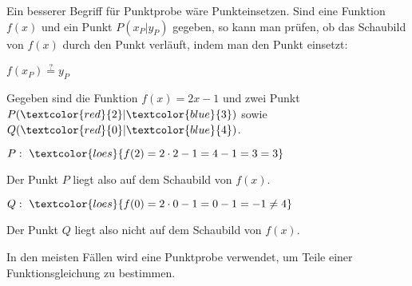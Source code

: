 Ein besserer Begriff für Punktprobe wäre Punkteinsetzen. Sind eine Funktion \(f(x)\) und ein Punkt \(P(x_P\vert y_P)\) gegeben, so kann man prüfen, ob das Schaubild von \(f(x)\) durch den Punkt verläuft, indem man den Punkt einsetzt:
\begin{tcolorbox}
	\centering
	\textcolor{loestc}{\(f(x_P)\overset{?}{=}y_P\)}
\end{tcolorbox}
\begin{bsp}
	Gegeben sind die Funktion \(f(x)=2x-1\) und zwei Punkt \(P(\textcolor{red}{2}\vert\textcolor{blue}{3})\) sowie \(Q(\textcolor{red}{0}\vert\textcolor{blue}{4})\).

	\(P:\ \textcolor{loes}{f(2)=2\cdot 2-1=4-1=3=3}\)

	Der Punkt \(P\) liegt also auf dem Schaubild von \(f(x)\).

	\(Q:\ \textcolor{loes}{f(0)=2\cdot 0-1=0-1=-1\neq4}\)

	Der Punkt \(Q\) liegt also nicht auf dem Schaubild von \(f(x)\).
\end{bsp}
In den meisten Fällen wird eine Punktprobe verwendet, um Teile einer Funktionsgleichung zu bestimmen.

